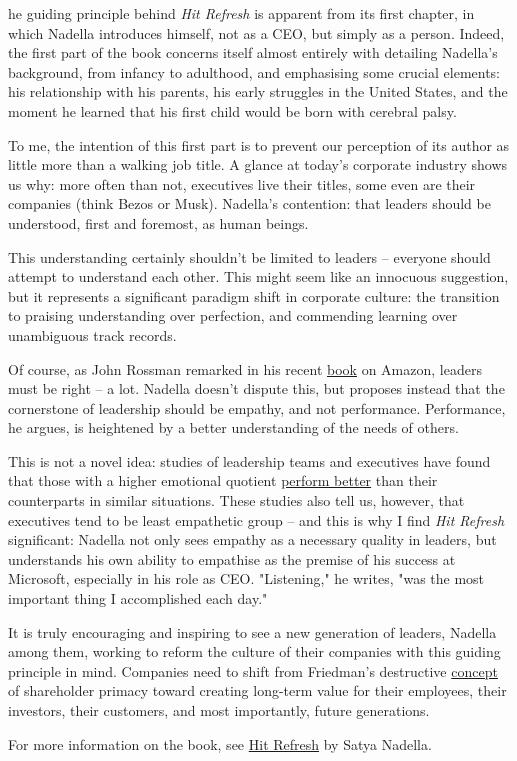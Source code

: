 \label{ch:hit-refresh}

{\flushright{}}
\smallskip

he guiding principle behind \emph{Hit Refresh} is apparent from its first
   chapter, in which Nadella introduces himself, not as a CEO, but simply
   as a person. Indeed, the first part of the book concerns itself almost
   entirely with detailing Nadella's background, from infancy to
   adulthood, and emphasising some crucial elements: his relationship with
   his parents, his early struggles in the United States, and the moment
   he learned that his first child would be born with cerebral palsy.

   To me, the intention of this first part is to prevent our perception of
   its author as little more than a walking job title. A glance at today's
   corporate industry shows us why: more often than not, executives live
   their titles, some even are their companies (think Bezos or Musk).
   Nadella's contention: that leaders should be understood, first and
   foremost, as human beings.

   This understanding certainly shouldn't be limited to leaders --
   everyone should attempt to understand each other. This might seem like
   an innocuous suggestion, but it represents a significant paradigm shift
   in corporate culture: the transition to praising understanding over
   perfection, and commending learning over unambiguous track records.

   Of course, as John Rossman remarked in his recent \href{https://www.goodreads.com/book/show/22393576-the-amazon-way}{book} on Amazon,
   leaders must be right -- a lot. Nadella doesn't dispute this, but
   proposes instead that the cornerstone of leadership should be empathy,
   and not performance. Performance, he argues, is heightened by a better
   understanding of the needs of others.

   This is not a novel idea: studies of leadership teams and executives
   have found that those with a higher emotional quotient \href{https://hbr.org/2015/04/measuring-the-return-on-character}{perform
   better} than their counterparts in similar situations. These studies
   also tell us, however, that executives tend to be least empathetic
   group -- and this is why I find \emph{Hit Refresh} significant: Nadella not
   only sees empathy as a necessary quality in leaders, but understands
   his own ability to empathise as the premise of his success at
   Microsoft, especially in his role as CEO. "Listening," he writes, "was
   the most important thing I accomplished each day."

   It is truly encouraging and inspiring to see a new generation of
   leaders, Nadella among them, working to reform the culture of their
   companies with this guiding principle in mind. Companies need to shift
   from Friedman's destructive \href{http://umich.edu/~thecore/doc/Friedman.pdf}{concept} of shareholder primacy toward
   creating long-term value for their employees, their investors, their
   customers, and most importantly, future generations.

   For more information on the book, see \href{https://www.goodreads.com/book/show/23258385-spaces-of-aid}{Hit Refresh} by Satya Nadella.
